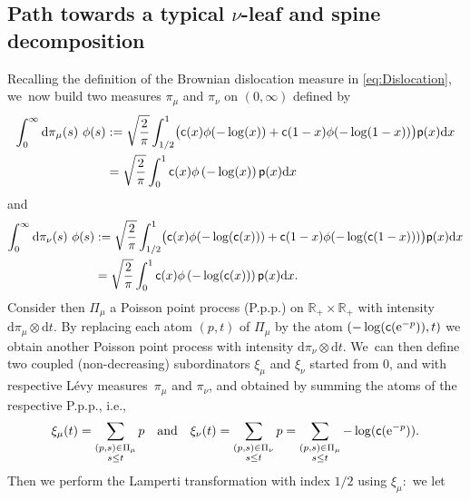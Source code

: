 \documentclass[11pt]{article}
\newcommand{\pp}{\mathsf{p}}
\newcommand{\dd}{\mathrm{d}}
\theoremstyle{definition}
\begin{document}
\subsection{Path towards a typical $\nu$-leaf and spine decomposition}
Recalling the definition of the Brownian dislocation measure in \eqref{eq:Dislocation}, we~now build two measures $\pi_\mu$ and $\pi_\nu$ on $(0,\infty)$ defined by
\begin{align*}
\int_{0}^{\infty} \mathrm{d} \pi_\mu(s) \ \phi(s) &:= \sqrt{\frac{2}{\pi}} \int_{1/2}^{1} \bigl(\ff(x) \phi(-\log (x)) + \ff(1-x) \phi(-\log (1-x))\bigr)\pp(x)\dd x \\
&= \sqrt{\frac{2}{\pi}} \int_0^{1} \ff(x) \phi\left(-\log (x)\right) \pp(x)\dd x
\end{align*}
and
\begin{align*} \int_{0}^{\infty} \mathrm{d} \pi_\nu(s) \ \phi(s) &:= \sqrt{\frac{2}{\pi}} \int_{1/2}^{1}\bigl(\ff(x) \phi(-\log (\ff(x))) + \ff(1-x) \phi(-\log (\ff(1-x)))\bigr)\pp(x)\dd x \\
&= \sqrt{\frac{2}{\pi}} \int_0^{1} \ff(x) \phi\left(-\log (\ff(x))\right)\pp(x)\dd x.
\end{align*}
Consider then $\Pi_\mu$ a Poisson point process (P.p.p.) on $ \mathbb{R}_+ \!\times\! \mathbb{R}_+$ with intensity \hbox{$ \mathrm{d} \pi_\mu \!\otimes\! \mathrm{d}t$}. By replacing each atom $(p,t)$ of $\Pi_\mu$ by the atom $(-\log(\mathsf{c} (\mathrm{e}^{-p})),t)$ we obtain another Poisson point process with intensity $ \mathrm{d}\pi_\nu \otimes \mathrm{d}t$. We~can then define two coupled (non-decreasing) subordinators $\xi_\mu$ and $\xi_\nu$ started from $0$, and with respective Lévy measures~$\pi_\mu$ and $\pi_\nu$, and obtained by summing the atoms of the respective P.p.p., i.e.,
\begin{equation}\label{defxi}
\xi_\mu(t) = \sum_{\begin{subarray}{c}(p,s) \in \Pi_\mu \\ s \leq t\end{subarray}} p \quad \text{and} \quad \xi_\nu(t) = \sum_{\begin{subarray}{c}(p,s) \in \Pi_\nu \\ s \leq t
\end{subarray}} p = \sum_{\begin{subarray}{c}(p,s) \in \Pi_\mu \\ s \leq t\end{subarray}} -\log(\ff (\mathrm{e}^{-p})).\end{equation}
Then we perform the Lamperti transformation with index $1/2$ using $\xi_\mu:$ we let
\end{document}
